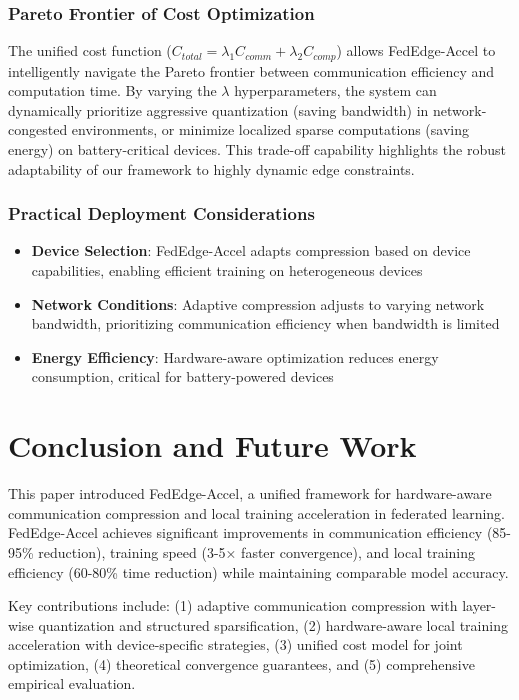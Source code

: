 \documentclass[journal]{IEEEtran}
\begin{document}
\subsubsection{Pareto Frontier of Cost Optimization}

The unified cost function ($C_{total} = \lambda_1 C_{comm} + \lambda_2 C_{comp}$) allows FedEdge-Accel to intelligently navigate the Pareto frontier between communication efficiency and computation time. By varying the $\lambda$ hyperparameters, the system can dynamically prioritize aggressive quantization (saving bandwidth) in network-congested environments, or minimize localized sparse computations (saving energy) on battery-critical devices. This trade-off capability highlights the robust adaptability of our framework to highly dynamic edge constraints.

\subsubsection{Practical Deployment Considerations}

\begin{itemize}
    \item \textbf{Device Selection}: FedEdge-Accel adapts compression based on device capabilities, enabling efficient training on heterogeneous devices
    \item \textbf{Network Conditions}: Adaptive compression adjusts to varying network bandwidth, prioritizing communication efficiency when bandwidth is limited
    \item \textbf{Energy Efficiency}: Hardware-aware optimization reduces energy consumption, critical for battery-powered devices
\end{itemize}

\section{Conclusion and Future Work}
\label{sec:conclusion}

This paper introduced FedEdge-Accel, a unified framework for hardware-aware communication compression and local training acceleration in federated learning. FedEdge-Accel achieves significant improvements in communication efficiency (85-95\% reduction), training speed (3-5× faster convergence), and local training efficiency (60-80\% time reduction) while maintaining comparable model accuracy.

Key contributions include: (1) adaptive communication compression with layer-wise quantization and structured sparsification, (2) hardware-aware local training acceleration with device-specific strategies, (3) unified cost model for joint optimization, (4) theoretical convergence guarantees, and (5) comprehensive empirical evaluation.
\end{document}
